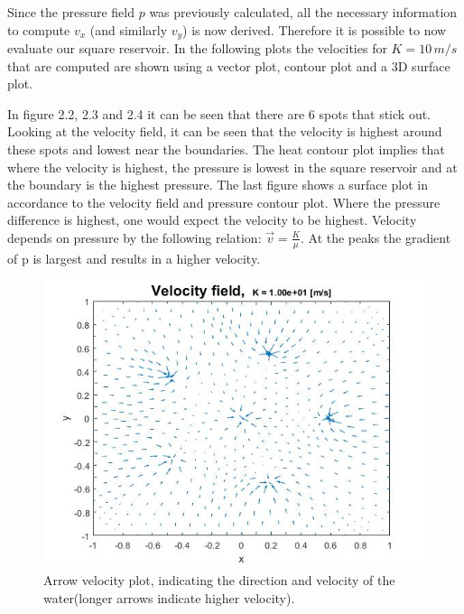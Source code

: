 \documentclass[a4paper]{report}
\begin{document}
Since the pressure field $p$ was previously calculated, all the necessary information to compute $v_x$ (and similarly $v_y$) is now derived. Therefore it is possible to now evaluate our square reservoir. In the following plots the velocities for $K=10\,m/s$ that are computed are shown using a vector plot, contour plot and a 3D surface plot.\par 
In figure 2.2, 2.3 and 2.4 it can be seen that there are 6 spots that stick out. Looking at the velocity field, it can be seen that the velocity is highest around these spots and lowest near the boundaries. The heat contour plot implies that where the velocity is highest, the pressure is lowest in the square reservoir and at the boundary is the highest pressure. The last figure shows a surface plot
in accordance to the velocity field and pressure contour plot. Where the pressure difference is highest, one would expect the velocity to be highest. Velocity depends on pressure by the following relation: $\vec{v}= \frac{K}{\mu}$. At the peaks the gradient of p is largest and results in a higher velocity.



\begin{figure}[ht!]
	\centering
	\includegraphics[width=130mm]{2Dvarrowsk10.jpg}
	\caption{Arrow velocity plot, indicating the direction and velocity of the water(longer arrows indicate higher velocity).
	\label{overflow}}
\end{figure}
\end{document}
